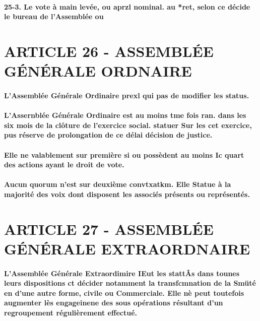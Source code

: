 \documentclass[a4paper, 11pt]{article}
\begin{document}
\paragraph{
  25-3. Le vote à main levée, ou aprzl nominal. au *ret, selon ce décide le bureau de l'Assemblée ou
}

\section*{ARTICLE 26 - ASSEMBLÉE GÉNÉRALE ORDNAIRE}

\paragraph{
  L'Assemblée Générale Ordinaire prexl qui pas de modifier les status.
}

\paragraph{
  L'Assernblée Générale Ordinaire est au moins tme fois ran. dans les six mois de la clôture de l'exercice social. statuer Sur les cet exercice, pus réserve de prolongation de ce délai décision de justice.
}

\paragraph{
  Elle ne valablement sur première si ou possèdent au moins Ic quart des actions ayant le droit de vote.
}

\paragraph{
  Aucun quorum n'est sur deuxième convtxatkm. Elle Statue à la majorité des voix dont disposent les associés présents ou représentés.
}

\section*{ARTICLE 27 - ASSEMBLÉE GÉNÉRALE EXTRAORDNAIRE}

\paragraph{
  L'Assemblée Générale Extraordimire IEut les stattÂs dans tounes leurs dispositions ct décider notamment la transfcmnation de la Smüté en d'une autre forme, civile ou Commerciale. Elle nè peut toutefois augmenter lès engageinene des sous opérations résultant d'un regroupement régulièrement effectué.
}
\end{document}
